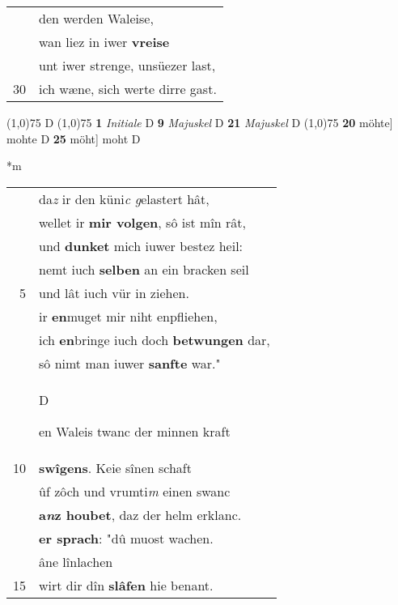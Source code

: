 \documentclass[8pt,a4paper,notitlepage]{article}
\begin{document}
\begin{table}[ht]
\begin{minipage}[t]{0.5\linewidth}
\begin{tabular}{rl}
 & den werden Waleise,\\ 
 & wan liez in iwer \textbf{vreise}\\ 
 & unt iwer strenge, unsüezer last,\\ 
30 & ich wæne, sich werte dirre gast.\\ 
\end{tabular}
\scriptsize
\line(1,0){75} \newline
D \newline
\line(1,0){75} \newline
\textbf{1} \textit{Initiale} D  \textbf{9} \textit{Majuskel} D  \textbf{21} \textit{Majuskel} D  \newline
\line(1,0){75} \newline
\textbf{20} möhte] mohte D \textbf{25} möht] moht D \newline
\end{minipage}
\hspace{0.5cm}
\begin{minipage}[t]{0.5\linewidth}
\small
\begin{center}*m
\end{center}
\begin{tabular}{rl}
 & da\textit{z} ir den küni\textit{c g}elastert hât,\\ 
 & wellet ir \textbf{mir volgen}, sô ist mîn rât,\\ 
 & und \textbf{dunket} mich iuwer bestez heil:\\ 
 & nemt iuch \textbf{selben} an ein bracken seil\\ 
5 & und lât iuch vür in ziehen.\\ 
 & ir \textbf{en}muget mir niht enpfliehen,\\ 
 & ich \textbf{en}bringe iuch doch \textbf{betwungen} dar,\\ 
 & sô nimt man iuwer \textbf{sanfte} war."\\ 
 & \begin{large}D\end{large}en Waleis twanc der minnen kraft\\ 
10 & \textbf{swîgens}. Keie sînen schaft\\ 
 & ûf zôch und vrumti\textit{m} einen swanc\\ 
 & \textbf{a\textit{n}z houbet}, daz der helm erklanc.\\ 
 & \textbf{er sprach}: "dû muost wachen.\\ 
 & âne lînlachen\\ 
15 & wirt dir dîn \textbf{slâfen} hie benant.\\ 

\end{tabular}
\end{minipage}
\end{table}
\end{document}
